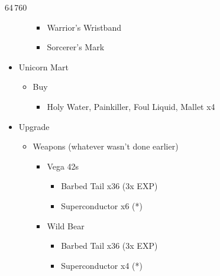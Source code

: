 \begin{multicols}{2}
\begin{shop}{64\,760}
\begin{itemize}
\begin{itemize}
\begin{itemize}
                      \item Warrior's Wristband
                      \item Sorcerer's Mark
                    \end{itemize}
            \end{itemize}
      \item Unicorn Mart
            \begin{itemize}
              \item Buy
                    \begin{itemize}
                      \item Holy Water, Painkiller, Foul Liquid, Mallet x4
                    \end{itemize}
            \end{itemize}
    \end{itemize}
  \end{shop}

  \begin{upgrade}
    \begin{itemize}
      \item Upgrade
            \begin{itemize}
              \item Weapons (whatever wasn't done earlier)
                    \begin{itemize}
                      \item Vega 42s
                            \begin{itemize}
                              \item Barbed Tail x36 (3x EXP)
                              \item Superconductor x6 (*)
                            \end{itemize}
                      \item Wild Bear
                            \begin{itemize}
                              \item Barbed Tail x36 (3x EXP)
                              \item Superconductor x4 (*)
                            \end{itemize}


\end{itemize}
\end{itemize}
\end{itemize}
\end{upgrade}
\end{multicols}
